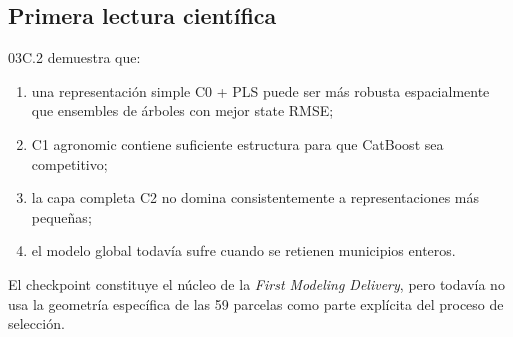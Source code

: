 \subsection{Primera lectura científica}

03C.2 demuestra que:
\begin{enumerate}
\item una representación simple C0 + PLS puede ser más robusta espacialmente que ensembles
de árboles con mejor state RMSE;
\item C1 agronomic contiene suficiente estructura para que CatBoost sea competitivo;
\item la capa completa C2 no domina consistentemente a representaciones más pequeñas;
\item el modelo global todavía sufre cuando se retienen municipios enteros.
\end{enumerate}

El checkpoint constituye el núcleo de la \emph{First Modeling Delivery}, pero todavía no usa
la geometría específica de las 59 parcelas como parte explícita del proceso de selección.
